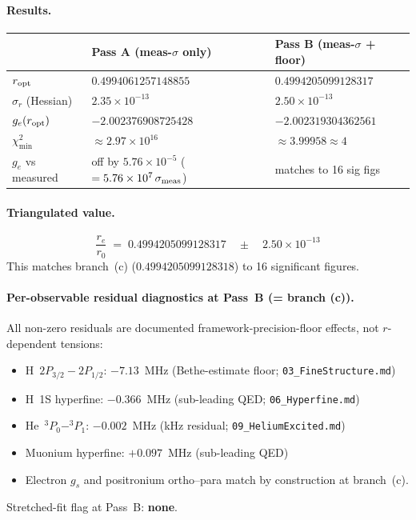 \paragraph{Results.}
\begin{center}
\begin{tabular}{lll}
\toprule
                       & Pass A (meas-$\sigma$ only)   & Pass B (meas-$\sigma$ + floor) \\
\midrule
$r_{\rm opt}$          & $0.4994061257148855$          & $\mathbf{0.4994205099128317}$ \\
$\sigma_r$ (Hessian)   & $2.35\times 10^{-13}$         & $2.50\times 10^{-13}$ \\
$g_e(r_{\rm opt})$     & $-2.002376908725428$          & $-2.002319304362561$ \\
$\chi^2_{\min}$        & $\approx 2.97\times 10^{16}$  & $\approx 3.99958 \approx 4$ \\
$g_e$ vs measured      & off by $5.76\times 10^{-5}$ ($= 5.76\times 10^{7}\,\sigma_{\rm meas}$) & matches to 16 sig figs \\
\bottomrule
\end{tabular}
\end{center}

\paragraph{Triangulated value.}
\[
\boxed{\;
  \frac{r_e}{r_0} \;=\; 0.4994205099128317
  \quad\pm\quad 2.50 \times 10^{-13}
\;}
\]
This matches branch~(c) ($0.4994205099128318$) to 16 significant figures.

\paragraph{Per-observable residual diagnostics at Pass~B (= branch (c)).}
All non-zero residuals are documented framework-precision-floor effects, not
$r$-dependent tensions:
\begin{itemize}[topsep=2pt,itemsep=0pt]
  \item H~$2P_{3/2}{-}2P_{1/2}$: $-7.13$~MHz (Bethe-estimate floor;
        \texttt{03\_FineStructure.md})
  \item H~1S hyperfine: $-0.366$~MHz (sub-leading QED;
        \texttt{06\_Hyperfine.md})
  \item He~$^3P_0{-}^3P_1$: $-0.002$~MHz (kHz residual;
        \texttt{09\_HeliumExcited.md})
  \item Muonium hyperfine: $+0.097$~MHz (sub-leading QED)
  \item Electron $g_s$ and positronium ortho--para match by construction
        at branch~(c).
\end{itemize}
Stretched-fit flag at Pass~B: \textbf{none}.

